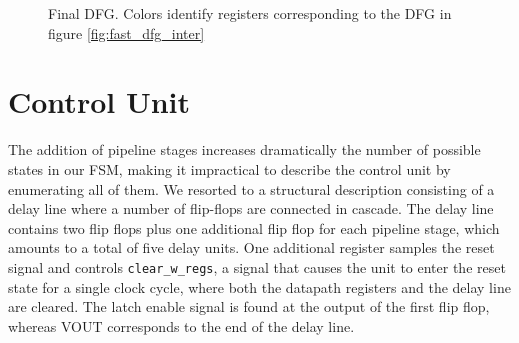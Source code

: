 \begin{figure}
	\caption{Final DFG. Colors identify registers corresponding to the DFG in figure \autoref{fig:fast_dfg_inter}}
	\label{fig:fast_dfg_final}
\end{figure}

\section{Control Unit}
The addition of pipeline stages increases dramatically the number of possible states in our FSM, making it impractical to describe the control unit by enumerating all of them. We resorted to a structural description consisting of a delay line where a number of flip-flops are connected in cascade. The delay line contains two flip flops plus one additional flip flop for each pipeline stage, which amounts to a total of five delay units. One additional register samples the reset signal and controls \texttt{clear\_w\_regs}, a signal that causes the unit to enter the reset state for a single clock cycle, where both the datapath registers and the delay line are cleared. The latch enable signal is found at the output of the first flip flop, whereas VOUT corresponds to the end of the delay line.
